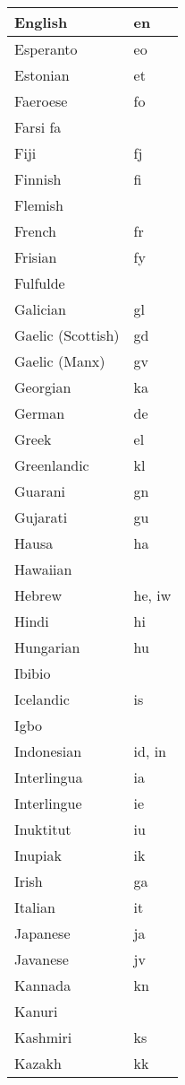 \begin{longtable}{|l|l|}
\hline
English				&en\\
\hline
Esperanto			&eo\\
\hline
Estonian				&et\\
\hline
Faeroese				&fo\\
\hline
Farsi	fa				&\\
\hline
Fiji					&fj\\
\hline
Finnish				&fi\\
\hline
Flemish				& \\
\hline
French				&fr\\
\hline
Frisian				&fy\\
\hline
Fulfulde				& \\
\hline
Galician				&gl\\
\hline
Gaelic (Scottish)		&gd\\
\hline
Gaelic (Manx)			&gv\\
\hline
Georgian				&ka\\
\hline
German				&de\\
\hline
Greek				&el\\
\hline
Greenlandic			&kl\\
\hline
Guarani				&gn\\
\hline
Gujarati				&gu\\
\hline
Hausa				&ha\\
\hline
Hawaiian				& \\
\hline
Hebrew				&he, iw\\
\hline
Hindi				&hi\\
\hline
Hungarian			&hu\\
\hline
Ibibio				 &\\
\hline
Icelandic				&is\\
\hline
Igbo	 				&\\
\hline
Indonesian			&id, in\\
\hline
Interlingua			&ia\\
\hline
Interlingue			&ie\\
\hline
Inuktitut				&iu\\
\hline
Inupiak				&ik\\
\hline
Irish					&ga\\
\hline
Italian				&it\\
\hline
Japanese				&ja\\
\hline
Javanese				&jv\\
\hline
Kannada				&kn\\
\hline
Kanuri				& \\
\hline
Kashmiri				&ks\\
\hline
Kazakh				&kk\\

\end{longtable}
